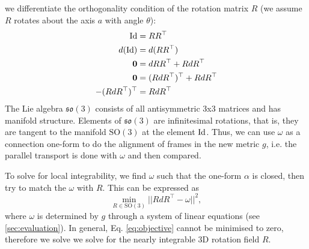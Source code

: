 \documentclass[../thesis.tex]{subfiles}
\begin{document}
we differentiate the orthogonality condition of the rotation matrix $R$ (we assume $R$ rotates about the axis $a$ with angle $\theta$):
\begin{align*}
  \operatorname{Id} &= RR^{\top} \\
  d(\operatorname{Id}) &= d(RR^{\top}) \\
  \bm{0} &= dRR^{\top} + RdR^{\top} \\
  \bm{0} &= (RdR^{\top})^{\top} + RdR^{\top} \\
  -(RdR^{\top})^{\top} &= RdR^{\top}
\end{align*}
The Lie algebra $\mathfrak{so}(3)$ consists of all antisymmetric 3x3 matrices and has manifold structure.
Elements of $\mathfrak{so}(3)$ are infinitesimal rotations, that is,
they are tangent to the manifold $\mathrm{SO}(3)$ at the element $\operatorname{Id}$.
Thus, we can use $\omega$ as a connection one-form to do the alignment of frames in
the new metric $g$, i.e. the parallel transport is done with $\omega$ and then compared.

To solve for local integrability, we find $\omega$ such that the one-form $\alpha$ is closed,
then try to match the $\omega$ with $R$. This can be expressed as
\begin{equation}\label{eq:objective}
  \min_{R\in \mathrm{SO}(3)} ||RdR^{\top} - \omega ||^2,
\end{equation}
where $\omega$ is determined by $g$ through a system of linear equations (see \ref{sec:evaluation}).
In general, Eq. \ref{eq:objective} cannot be minimised to zero, therefore we solve we solve
for the nearly integrable 3D rotation field $R$.
\end{document}
